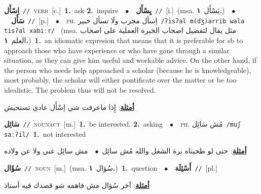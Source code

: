 \documentclass[10pt,a4paper,twoside]{article} %
\begin{document}
\begin{multicols}{2}
{\setlength\topsep{0pt}\textbf{\foreignlanguage{arabic}{اِسْأَل}}\ {\color{gray}\texttt{//}\color{black}}\ \textsc{verb}\ [c.]\ \textbf{1.}~ask  \textbf{2.}~inquire\ \ $\bullet$\ \ \setlength\topsep{0pt}\textbf{\foreignlanguage{arabic}{يِسْأَل}}\ {\color{gray}\texttt{//}\color{black}}\ [i.]\ \color{gray}(msa. \foreignlanguage{arabic}{يَسْأَل}~\foreignlanguage{arabic}{\textbf{١.}})\color{black}\ \ $\bullet$\ \ \setlength\topsep{0pt}\textbf{\foreignlanguage{arabic}{سَأَل}}\ {\color{gray}\texttt{//}\color{black}}\ [p.]\ \ $\bullet$\ \ \textsc{ph.} \color{gray} \foreignlanguage{arabic}{اِسأل مجرب ولَا تسأل خبير}\color{black}\ {\color{gray}\texttt{/{\sffamily ʔisʔal m(dʒ)arrib wala tisʔal xabiːr}/}\color{black}}\ \color{gray} (msa. \foreignlanguage{arabic}{مثل يقال لتفضيل اصحاب الخبرة العملية على اصحاب العلم}~\foreignlanguage{arabic}{\textbf{١.}})\color{black}\ \textbf{1.}~an idiomatic expresion that means that it is preferable for sb to approach those who have experience or who have gone through a similar situation, as they can give him useful and workable advice. On the other hand, if the person who needs help approached a scholar (because he is knowledgeable), most probably, the scholar will either pontificate over the matter or be too idealistic. The problem thus will not be resolved.\  \begin{flushright}\color{gray}\foreignlanguage{arabic}{\textbf{\underline{\foreignlanguage{arabic}{أمثلة}}}: إِذا ماعرفت شي اِسْأَل عادي تستحيش}\end{flushright}\color{black}} \vspace{2mm}

{\setlength\topsep{0pt}\textbf{\foreignlanguage{arabic}{سَائِل}}\ {\color{gray}\texttt{//}\color{black}}\ \textsc{noun\textunderscore act}\ [m.]\ \textbf{1.}~be interested.  \textbf{2.}~asking\ \ $\bullet$\ \ \textsc{ph.} \color{gray} \foreignlanguage{arabic}{مُش سَائِل}\color{black}\ {\color{gray}\texttt{/{\sffamily muʃ saːʔil}/}\color{black}}\ \textbf{1.}~not interested\  \begin{flushright}\color{gray}\foreignlanguage{arabic}{\textbf{\underline{\foreignlanguage{arabic}{أمثلة}}}: حتى لو طحيناه برة الشغل والله مُش سائِل\ $\bullet$\ \  مش سائِل عني ولا عن ولاده}\end{flushright}\color{black}} \vspace{2mm}

{\setlength\topsep{0pt}\textbf{\foreignlanguage{arabic}{سُؤَال}}\ {\color{gray}\texttt{//}\color{black}}\ \textsc{noun}\ [m.]\ \color{gray}(msa. \foreignlanguage{arabic}{سُؤال}~\foreignlanguage{arabic}{\textbf{١.}})\color{black}\ \textbf{1.}~question\ \ $\bullet$\ \ \setlength\topsep{0pt}\textbf{\foreignlanguage{arabic}{أَسْئِلَة}}\ {\color{gray}\texttt{//}\color{black}}\ [pl.]\  \begin{flushright}\color{gray}\foreignlanguage{arabic}{\textbf{\underline{\foreignlanguage{arabic}{أمثلة}}}: آخر سُؤال مش فاهمه شو قصدك فيه أستاذ}\end{flushright}\color{black}} \vspace{2mm}


\end{multicols}
\end{document}
